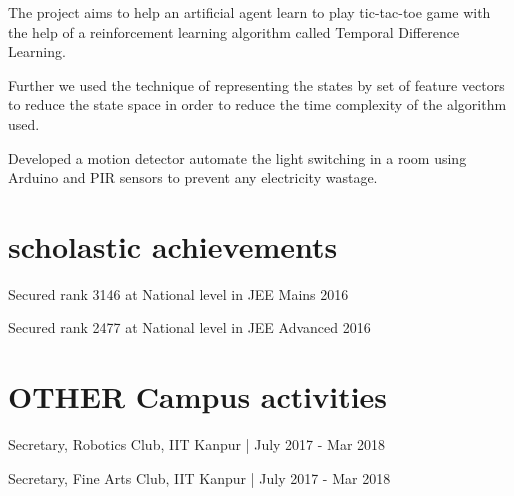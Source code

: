 \documentclass[]{deedy-resume-openfont}
\begin{document}
\begin{minipage}[t]{0.66\textwidth}
\begin{tightemize}
\item The project aims to help an artificial agent learn to play tic-tac-toe game with the help of a  reinforcement learning algorithm called Temporal Difference Learning.
\item Further we used the technique of representing the states by set of feature vectors to reduce the state space in order to reduce the time complexity of the algorithm used.
\end{tightemize}
\sectionsep

\begin{tightemize}
\item Developed a motion detector automate the light switching in a room using Arduino and PIR sensors to prevent any electricity wastage.
\end{tightemize}
\sectionsep


\section{scholastic achievements} 
\vspace{\topsep} %
\begin{tightemize}
\item Secured rank 3146 at National level in JEE Mains 2016 \\ 
\item Secured rank 2477 at National level in JEE Advanced 2016
\end{tightemize}
\sectionsep


\section{OTHER Campus activities}
\vspace{\topsep} %
\begin{tightemize}
\item Secretary, Robotics Club, IIT Kanpur | July 2017 - Mar 2018 \\
\item Secretary, Fine Arts Club, IIT Kanpur | July 2017 - Mar 2018 \\
\end{tightemize}


\end{minipage} 
\end{document}
